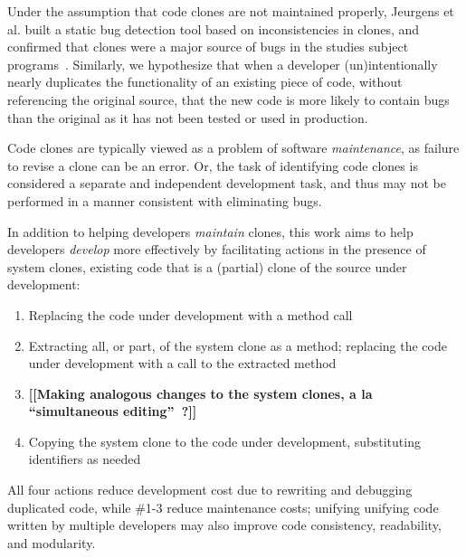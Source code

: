 \documentclass[preprint,10pt]{sigplanconf}
\newcommand{\todo}[1]{{\bfseries [[#1]]}}
\begin{document}

Under the assumption that code clones are not maintained properly,
Jeurgens et al. built a static bug detection tool based on
inconsistencies in clones, and confirmed that clones were a major
source of bugs in the studies subject programs~\cite{Juergens2009}.
Similarly, we hypothesize that when a developer (un)intentionally
nearly duplicates the functionality of an existing piece of code, without
referencing the original source, that the new code is more likely to
contain bugs than the original as it has not been tested or used in
production.

Code clones are typically viewed as a problem of software
\emph{maintenance}, as failure to revise a clone can be an error. 
Or, the task of identifying code clones is considered a separate and
independent development task, and thus may not be performed in a
manner consistent with eliminating bugs.

In addition to helping developers \emph{maintain} clones, this work
aims to help developers \emph{develop} more effectively by
facilitating actions in the presence of system clones, existing code
that is a (partial) clone of the source under development:

\begin{enumerate}
  \item Replacing the code under development with a method call
  \item Extracting all, or part, of the system clone as a method;
    replacing the code under development with a call to the extracted
    method
  \item \todo{Making analogous changes to the system clones, a la
    ``simultaneous editing''~\cite{Miller2002}?}
  \item Copying the system clone to the code under development,
    substituting identifiers as needed
\end{enumerate}

All four actions reduce development cost due to rewriting and
debugging duplicated code, while \#1-3 reduce maintenance costs;
unifying unifying code written by multiple developers may also improve
code consistency, readability, and modularity.
\end{document}
